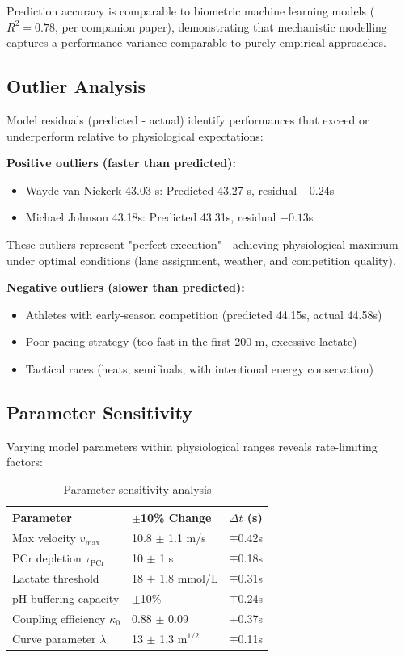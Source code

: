 \documentclass[12pt,a4paper]{article}
\begin{document}
Prediction accuracy is comparable to biometric machine learning models ($R^2 = 0.78$, per companion paper), demonstrating that mechanistic modelling captures a performance variance comparable to purely empirical approaches.

\subsection{Outlier Analysis}

Model residuals (predicted - actual) identify performances that exceed or underperform relative to physiological expectations:

\textbf{Positive outliers (faster than predicted):}
\begin{itemize}
    \item Wayde van Niekerk 43.03 s: Predicted 43.27 s, residual $-0.24$s
    \item Michael Johnson 43.18s: Predicted 43.31s, residual $-0.13$s
\end{itemize}

These outliers represent "perfect execution"—achieving physiological maximum under optimal conditions (lane assignment, weather, and competition quality).

\textbf{Negative outliers (slower than predicted):}
\begin{itemize}
    \item Athletes with early-season competition (predicted 44.15s, actual 44.58s)
    \item Poor pacing strategy (too fast in the first 200 m, excessive lactate)
    \item Tactical races (heats, semifinals, with intentional energy conservation)
\end{itemize}

\subsection{Parameter Sensitivity}

Varying model parameters within physiological ranges reveals rate-limiting factors:

\begin{table}[H]
\centering
\caption{Parameter sensitivity analysis}
\begin{tabular}{@{}lll@{}}
\toprule
\textbf{Parameter} & \textbf{$\pm$10\% Change} & \textbf{$\Delta t$ (s)} \\
\midrule
Max velocity $v_{\max}$ & 10.8 $\pm$ 1.1 m/s & $\mp$0.42s \\
PCr depletion $\tau_{\text{PCr}}$ & 10 $\pm$ 1 s & $\mp$0.18s \\
Lactate threshold & 18 $\pm$ 1.8 mmol/L & $\mp$0.31s \\
pH buffering capacity & $\pm$10\% & $\mp$0.24s \\
Coupling efficiency $\kappa_0$ & 0.88 $\pm$ 0.09 & $\mp$0.37s \\
Curve parameter $\lambda$ & 13 $\pm$ 1.3 m$^{1/2}$ & $\mp$0.11s \\
\bottomrule
\end{tabular}
\end{table}
\end{document}
